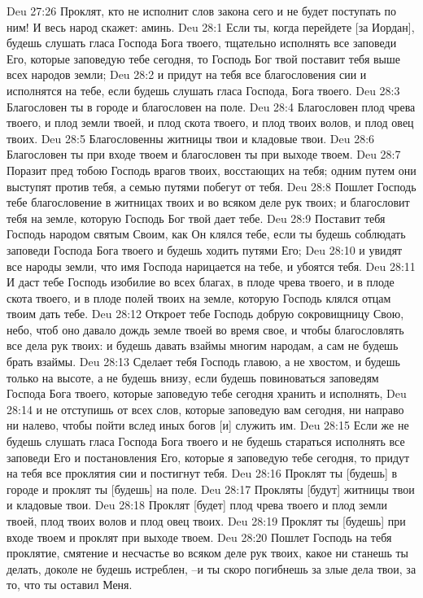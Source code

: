 Deu 27:26  Проклят, кто не исполнит слов закона сего и не будет поступать по ним! И весь народ скажет: аминь.
Deu 28:1  Если ты, когда перейдете [за Иордан], будешь слушать гласа Господа Бога твоего, тщательно исполнять все заповеди Его, которые заповедую тебе сегодня, то Господь Бог твой поставит тебя выше всех народов земли;
Deu 28:2  и придут на тебя все благословения сии и исполнятся на тебе, если будешь слушать гласа Господа, Бога твоего.
Deu 28:3  Благословен ты в городе и благословен на поле.
Deu 28:4  Благословен плод чрева твоего, и плод земли твоей, и плод скота твоего, и плод твоих волов, и плод овец твоих.
Deu 28:5  Благословенны житницы твои и кладовые твои.
Deu 28:6  Благословен ты при входе твоем и благословен ты при выходе твоем.
Deu 28:7  Поразит пред тобою Господь врагов твоих, восстающих на тебя; одним путем они выступят против тебя, а семью путями побегут от тебя.
Deu 28:8  Пошлет Господь тебе благословение в житницах твоих и во всяком деле рук твоих; и благословит тебя на земле, которую Господь Бог твой дает тебе.
Deu 28:9  Поставит тебя Господь народом святым Своим, как Он клялся тебе, если ты будешь соблюдать заповеди Господа Бога твоего и будешь ходить путями Его;
Deu 28:10  и увидят все народы земли, что имя Господа нарицается на тебе, и убоятся тебя.
Deu 28:11  И даст тебе Господь изобилие во всех благах, в плоде чрева твоего, и в плоде скота твоего, и в плоде полей твоих на земле, которую Господь клялся отцам твоим дать тебе.
Deu 28:12  Откроет тебе Господь добрую сокровищницу Свою, небо, чтоб оно давало дождь земле твоей во время свое, и чтобы благословлять все дела рук твоих: и будешь давать взаймы многим народам, а сам не будешь брать взаймы.
Deu 28:13  Сделает тебя Господь главою, а не хвостом, и будешь только на высоте, а не будешь внизу, если будешь повиноваться заповедям Господа Бога твоего, которые заповедую тебе сегодня хранить и исполнять,
Deu 28:14  и не отступишь от всех слов, которые заповедую вам сегодня, ни направо ни налево, чтобы пойти вслед иных богов [и] служить им.
Deu 28:15  Если же не будешь слушать гласа Господа Бога твоего и не будешь стараться исполнять все заповеди Его и постановления Его, которые я заповедую тебе сегодня, то придут на тебя все проклятия сии и постигнут тебя.
Deu 28:16  Проклят ты [будешь] в городе и проклят ты [будешь] на поле.
Deu 28:17  Прокляты [будут] житницы твои и кладовые твои.
Deu 28:18  Проклят [будет] плод чрева твоего и плод земли твоей, плод твоих волов и плод овец твоих.
Deu 28:19  Проклят ты [будешь] при входе твоем и проклят при выходе твоем.
Deu 28:20  Пошлет Господь на тебя проклятие, смятение и несчастье во всяком деле рук твоих, какое ни станешь ты делать, доколе не будешь истреблен, --и ты скоро погибнешь за злые дела твои, за то, что ты оставил Меня.
